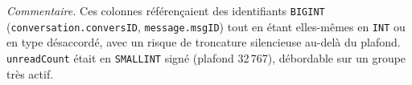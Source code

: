 \documentclass[a4paper,11pt]{article}
\begin{document}
\noindent\textit{Commentaire.} Ces colonnes référençaient des identifiants \texttt{BIGINT} (\texttt{conversation.conversID}, \texttt{message.msgID}) tout en étant elles-mêmes en \texttt{INT} ou en type désaccordé, avec un risque de troncature silencieuse au-delà du plafond. \texttt{unreadCount} était en \texttt{SMALLINT} signé (plafond 32\,767), débordable sur un groupe très actif.
%
%
%
%
%
%
%
%
%
%
%
\end{document}
